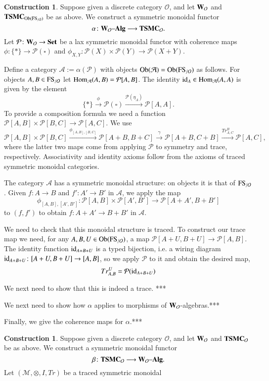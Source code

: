\documentclass{amsart}
\def\tn{\textnormal}
\def\mc{\mathcal}
\def\Hom{\tn{Hom}}
\def\Ob{\tn{Ob}}
\def\singleton{{\{*\}}}
\def\to{\rightarrow}
\def\tensor{\otimes}
\def\taking{\colon}
\def\too{\longrightarrow}
\newcommand{\To}[1]{\xrightarrow{#1}}
\newcommand{\Too}[1]{\xrightarrow{\ \ #1\ \ }}
\def\id{\tn{id}}
\def\Set{{\bf Set}}
\def\alg{{\text \textendash}{\bf Alg}}
\def\mcA{\mc{A}}
\def\mcM{\mc{M}}
\def\mcO{\mc{O}}
\def\mcP{\mc{P}}
\def\bfW{{\bf W}}
\newcommand{\Wir}[1]{\bfW_{#1}}
\def\TSMC{{\bf TSMC}}
\newcommand{\FS}[1]{\tn{FS}_{/\mathcal{#1}}}
\def\TFSO{\text{\bf TSMC}_{\Ob(\FS{O})}}
\theoremstyle{remark}
\theoremstyle{definition}
\newtheorem{construction}[subsubsection]{Construction}
\begin{document}
\begin{construction}

Suppose given a discrete category $\mcO$, and let $\Wir{\mcO}$ and $\TFSO$ be as above. We construct a symmetric monoidal functor 
$$\alpha\taking\Wir{\mcO}\alg\too\TSMC_\mcO.$$
Let $\mcP\taking\Wir{\mcO}\to\Set$ be a lax symmetric monoidal functor with coherence maps $\phi\taking\singleton\to\mcP(\square)$ and $\phi_{X,Y}\taking\mcP(X)\times\mcP(Y)\to\mcP(X+Y)$. 

Define a category $\mcA:=\alpha(\mcP)$ with objects $\Ob(\mcA)=\Ob(\FS{O})$ as follows. For objects $A,B\in\FS{O}$ let $\Hom_{\mcA}(A,B)=\mcP[A,B]$. The identity $\id_A\in\Hom_\mcA(A,A)$ is given by the element
$$\singleton\To{\phi}\mcP(\square)\To{\mcP(\eta_A)}\mcP[A,A].$$
To provide a composition formula we need a function $\mcP[A,B]\times\mcP[B,C]\to\mcP[A,C]$. We use 
$$\mcP[A,B]\times\mcP[B,C]\To{\phi_{[A,B],[B,C]}}\mcP[A+B,B+C]\Too{\gamma}\mcP[A+B,C+B]\To{Tr^B_{A,C}}\mcP[A,C],$$
where the latter two maps come from applying $\mcP$ to symmetry and trace, respectively. Associativity and identity axioms follow from the axioms of traced symmetric monoidal categories.

The category $\mcA$ has a symmetric monoidal structure: on objects it is that of $\FS{O}$. Given $f\taking A\to B$ and $f'\taking A'\to B'$ in $\mcA$, we apply the map 
$$\phi_{[A,B],[A',B']}\taking\mcP[A,B]\times\mcP[A',B']\to\mcP[A+A',B+B']$$
to $(f,f')$ to obtain $f\taking A+ A'\too B+ B'$ in $\mcA$. 

We need to check that this monoidal structure is traced. To construct our trace map we need, for any $A,B,U\in\Ob(\FS{O})$, a map $\mcP[A+U,B+U]\too\mcP[A,B]$. The identity function $\id_{A+B+U}$ is a typed bijection, i.e. a wiring diagram $\id_{A+B+U}\taking [A+U,B+U]\to[A,B]$, so we apply $\mcP$ to it and obtain the desired map, 
$$Tr^U_{A,B}=\mcP(\id_{A+B+U})$$

We next need to show that this is indeed a trace. ***

We next need to show how $\alpha$ applies to morphisms of $\Wir{\mcO}$-algebras.***

Finally, we give the coherence maps for $\alpha$.***

\end{construction}

\begin{construction}

Suppose given a discrete category $\mcO$, and let $\Wir{\mcO}$ and $\TSMC_\mcO$ be as above. We construct a symmetric monoidal functor 
$$\beta\taking\TSMC_\mcO\too\Wir{\mcO}\alg.$$
Let $(\mcM,\tensor,I,Tr)$ be a traced symmetric monoidal 

\end{construction}
\end{document}
